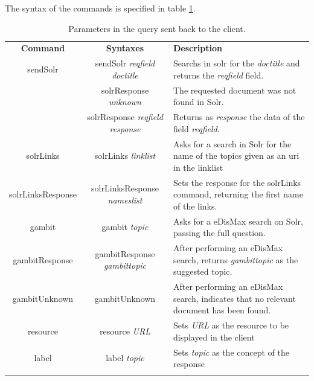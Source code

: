 The syntax of the commands is specified in table \ref{tab:oob-commands}.
\begin{center}
  \centering
  \begin{table}
    \begin{tabular*}{0.7\textwidth}{@{\extracolsep{\fill}} | c | c | p{} |}
      \hhline{|-|-|-|}
      \textbf{Command} & \textbf{Syntaxes} & \textbf{Description} \\ \hhline{|=|=|=|}
      sendSolr & sendSolr \textit{reqfield} \textit{doctitle} & Searchs in solr for the \textit{doctitle} and returns the \textit{reqfield} field.  \\ \hhline{|-|-|-|}
      \multirow{2}{*}{solrResponse} & solrResponse \textit{unknown} & The requested document was not found in Solr. \\ \cline{2-3}
				     & solrResponse \textit{reqfield} \textit{response} & Returns as \textit{response} the data of the field \textit{reqfield}. \\ \hhline{|-|-|-|}
      solrLinks & solrLinks \textit{linklist} & Asks for a search in Solr for the name of the topics given as an uri in the linklist \\ \hhline{|-|-|-|}
      solrLinksResponse & solrLinksResponse \textit{nameslist} & Sets the response for the solrLinks command, returning the first name of the links. \\ \hhline{|-|-|-|}
      gambit & gambit \textit{topic}& Asks for a \ac{eDisMax} search on Solr, passing the full question. \\ \hhline{|-|-|-|}
      gambitResponse & gambitResponse \textit{gambittopic} & After performing an \ac{eDisMax} search, returns \textit{gambittopic} as the suggested topic. \\ \hhline{|-|-|-|}
      gambitUnknown & gambitUnknown & After performing an \ac{eDisMax} search, indicates that no relevant document has been found. \\ \hhline{|-|-|-|}
      resource & resource \textit{URL} & Sets \textit{URL} as the resource to be displayed in the client \\ \hhline{|-|-|-|}
      label & label \textit{topic} & Sets \textit{topic} as the concept of the response \\ \hhline{|-|-|-|}
      \end{tabular*}
    \caption{Parameters in the query sent back to the client.}
    \label{tab:oob-commands}
  \end{table}
\end{center}

